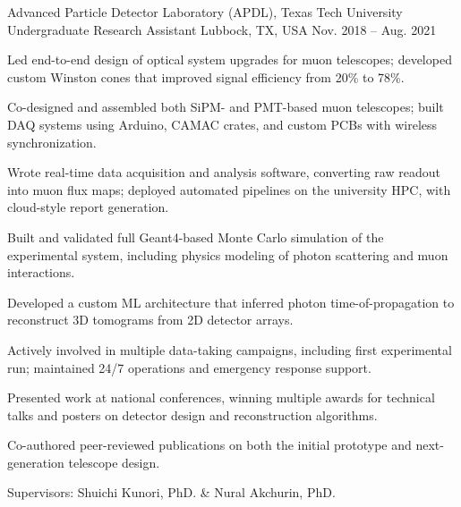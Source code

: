 \begin{cventries}
\cventry
  {Advanced Particle Detector Laboratory (APDL), Texas Tech University}
  {Undergraduate Research Assistant}
  {Lubbock, TX, USA}
  {Nov. 2018 – Aug. 2021}
  {
    \begin{cvitems}
      \item{Led end-to-end design of optical system upgrades for muon telescopes; developed custom Winston cones that improved signal efficiency from 20\% to 78\%.}
      \item{Co-designed and assembled both SiPM- and PMT-based muon telescopes; built DAQ systems using Arduino, CAMAC crates, and custom PCBs with wireless synchronization.}
      \item{Wrote real-time data acquisition and analysis software, converting raw readout into muon flux maps; deployed automated pipelines on the university HPC, with cloud-style report generation.}
      \item{Built and validated full Geant4-based Monte Carlo simulation of the experimental system, including physics modeling of photon scattering and muon interactions.}
      \item{Developed a custom ML architecture that inferred photon time-of-propagation to reconstruct 3D tomograms from 2D detector arrays.}
      \item{Actively involved in multiple data-taking campaigns, including first experimental run; maintained 24/7 operations and emergency response support.}
      \item{Presented work at national conferences, winning multiple awards for technical talks and posters on detector design and reconstruction algorithms.}
      \item{Co-authored peer-reviewed publications on both the initial prototype and next-generation telescope design.}
    \item{Supervisors: Shuichi Kunori, PhD. \& Nural Akchurin, PhD.}
    \end{cvitems}
  }


\end{cventries}
